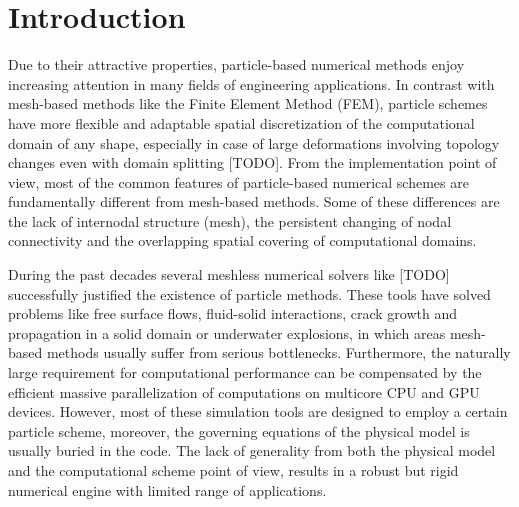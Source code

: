 \documentclass[a4paper,12pt,openany]{book}
\theoremstyle{break}
\begin{document}
\section{Introduction}
Due to their attractive properties, particle-based numerical methods enjoy increasing attention in many fields of engineering applications. In contrast with mesh-based methods  like the Finite Element Method (FEM), particle schemes have more flexible and adaptable spatial discretization of the computational domain of any shape, especially in case of large deformations involving topology changes even with domain splitting [TODO].
From the implementation point of view, most of the common features of particle-based numerical schemes are fundamentally different from mesh-based methods. Some of these differences are the lack of internodal structure (mesh), the persistent changing of nodal connectivity and the overlapping spatial covering of computational domains.

During the past decades several meshless numerical solvers like [TODO] successfully justified the existence of particle methods. These tools have solved problems like free surface flows, fluid-solid interactions, crack growth and propagation in a solid domain or underwater explosions, in which areas mesh-based methods usually suffer from serious bottlenecks. Furthermore, the naturally large requirement for computational performance can be compensated by the efficient massive parallelization of computations on multicore CPU and GPU devices. However, most of these simulation tools are designed to employ a certain particle scheme, moreover, the governing equations of the physical model is usually buried in the code. The lack of generality from both the physical model and the computational scheme point of view, results in a robust but rigid numerical engine with limited range of applications. %
\end{document}
